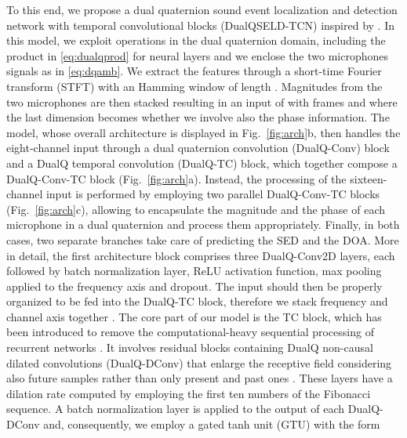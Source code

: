 \documentclass[3p, preprint, twocolumn]{elsarticle}
\begin{document}
To this end, we propose a dual quaternion sound event localization and detection network with temporal convolutional blocks (DualQSELD-TCN) inspired by \cite{Brignone2022ISCAS}. In this model, we exploit operations in the dual quaternion domain, including the product in \eqref{eq:dualqprod} for neural layers and we enclose the two microphones signals as in \eqref{eq:dqamb}.
We extract the features through a short-time Fourier transform (STFT) with an Hamming window of length . Magnitudes from the two microphones are then stacked resulting in an input of  with  frames and where the last dimension becomes  whether we involve also the phase information. The model, whose overall architecture is displayed in Fig.~\ref{fig:arch}b, then handles the eight-channel input through a dual quaternion convolution (DualQ-Conv) block and a DualQ temporal convolution (DualQ-TC) block, which together compose a DualQ-Conv-TC block (Fig.~\ref{fig:arch}a). Instead, the processing of the sixteen-channel input is performed by employing two parallel DualQ-Conv-TC blocks (Fig.~\ref{fig:arch}c), allowing to encapsulate the magnitude and the phase of each microphone in a dual quaternion and process them appropriately. Finally, in both cases, two separate branches take care of predicting the SED and the DOA. More in detail, the first architecture block comprises three DualQ-Conv2D layers, each followed by batch normalization layer, ReLU activation function, max pooling applied to the frequency axis and dropout. The input should then be properly organized to be fed into the DualQ-TC block, therefore we stack frequency and channel axis together \cite{Brignone2022ISCAS}. The core part of our model is the TC block, which has been introduced to remove the computational-heavy sequential processing of recurrent networks \cite{SELD-TCN}. It involves  residual blocks containing DualQ non-causal dilated convolutions (DualQ-DConv) that enlarge the receptive field considering also future samples rather than only present and past ones \cite{oord2016wavenet, wavenet}. These layers have a dilation rate computed by employing the first ten numbers of the Fibonacci sequence. A batch normalization layer is applied to the output of each DualQ-DConv and, consequently, we employ a gated tanh unit (GTU) with the form
\end{document}
